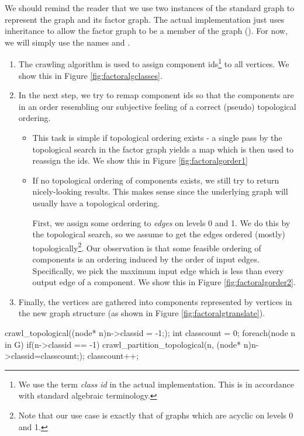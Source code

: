 We should remind the reader that we use two instances of the standard graph to represent the graph and its factor graph. The actual implementation just uses inheritance to allow the factor graph to be a member of the graph (). For now, we will simply use the names  and .
\begin{enumerate}
  \item The crawling algorithm is used to assign component ids\footnote{We use the term \emph{class id} in the actual implementation. This is in accordance with standard algebraic terminology.} to all vertices. We show this in Figure \ref{fig:factoralgclasses}.
  \item In the next step, we try to remap component ids so that the components are in an order resembling our subjective feeling of a correct (pseudo) topological ordering. 
    \begin{itemize}
      \item This task is simple if topological ordering exists - a single pass by the topological search in the factor graph yields a map which is then used to reassign the ids. We show this in Figure \ref{fig:factoralgorder1}
      \item If no topological ordering of components exists, we still try to return nicely-looking results. This makes sense since the underlying graph will usually have a topological ordering. 
        
        First, we assign some ordering to \emph{edges} on levels 0 and 1. We do this by the topological search, so we assume to get the edges ordered (mostly) topologically\footnote{Note that our use case is exactly that of graphs which are acyclic on levels 0 and 1.}. Our observation is that some feasible ordering of components is an ordering induced by the order of input edges. Specifically, we pick the  maximum input edge which is less than every output edge of a component. We show this in Figure \ref{fig:factoralgorder2}.
  \end{itemize}
  \item Finally, the vertices are gathered into components represented by vertices in the new graph structure (as shown in Figure \ref{fig:factoralgtranslate}).
\end{enumerate}

\FloatBarrier

\mybeginfigloose
\begin{code}
crawl_topological((node* n){n->classid = -1;});
int classcount = 0;
foreach(node n in G)
  if(n->classid == -1)
  {
    crawl_partition_topological(n, (node* n){n->classid=classcount;});
    classcount++;
  }
\end{code}

